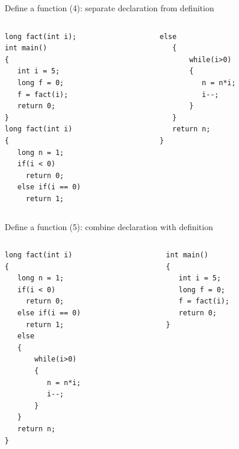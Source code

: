 \begin{frame}[fragile]{Define a function (4): separate declaration from definition}
\vspace{-0.2in}
\begin{columns}
\begin{column}{0.48\linewidth}
\begin{lstlisting}
long fact(int i); 
int main()
{
   int i = 5;
   long f = 0;
   f = fact(i);
   return 0; 
}
long fact(int i)
{
   long n = 1;
   if(i < 0)
     return 0;
   else if(i == 0)
     return 1;

\end{lstlisting}
\end{column}
\begin{column}{0.48\linewidth}
\begin{lstlisting}[firstnumber=16]
   else
   {
       while(i>0)
       {
          n = n*i;
          i--;
       }
   }
   return n;
}

\end{lstlisting}
\end{column}
\end{columns}
\end{frame}

\begin{frame}[fragile]{Define a function (5): combine declaration with definition}
\vspace{-0.2in}
\begin{columns}
\begin{column}{0.48\linewidth}
\begin{lstlisting}
long fact(int i)
{
   long n = 1;
   if(i < 0)
     return 0;
   else if(i == 0)
     return 1;
   else
   {
       while(i>0)
       {
          n = n*i;
          i--;
       }
   }
   return n;
}
\end{lstlisting}
\end{column}
\begin{column}{0.48\linewidth}
\begin{lstlisting}[firstnumber=18]
int main()
{
   int i = 5;
   long f = 0;
   f = fact(i);
   return 0; 
}

\end{lstlisting}
\end{column}
\end{columns}
\end{frame}

